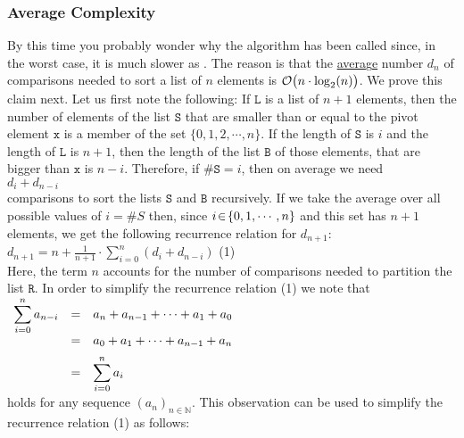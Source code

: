 \subsubsection{Average Complexity}
By this time you probably wonder why the algorithm has been called  since, in the worst case,
it is much slower as .  The reason is that the \underline{avera}g\underline{e} number $d_n$ of 
comparisons needed to sort a list of $n$ elements is $\mathcal{O}\bigl(n \cdot \log_2(n)\bigr)$. We prove
this claim next.  Let us first note the following: If $\mathtt{L}$ is a list of $n+1$ elements, then the number of elements of the 
list $\mathtt{S}$ that are smaller than or equal to the pivot element $\mathtt{x}$ is a member of the set 
$\{0,1,2,\cdots,n\}$.  If the length of $\mathtt{S}$ is $i$ and the length of $\mathtt{L}$ is $n+1$, then the length
of the list $\mathtt{B}$ of those elements, that are bigger than $\mathtt{x}$ is $n-i$.  Therefore, if $\#\mathtt{S} = i$, then on average we need
\\[0.2cm]
\hspace*{1.3cm} $d_i + d_{n-i}$ \\[0.2cm]
comparisons to sort the lists $\mathtt{S}$ and $\mathtt{B}$ recursively.  If we take the average over all possible values of
 $i = \#S$ then, since $i \!\in\!\{0,1,\cdots,n\}$ and this set has $n+1$ elements, we get the following
 recurrence relation for $d_{n+1}$: 
\\[0.2cm]
\hspace*{1.3cm}
$\displaystyle d_{n+1} = n + \frac{1}{n+1} \cdot \sum\limits_{i=0}^n (d_i + d_{n-i}) $ \hspace*{\fill} (1) 
\\[0.2cm] 
Here, the term $n$ accounts for the number of comparisons needed to partition the list $\mathtt{R}$.
In order to simplify the recurrence relation (1) we note that
\\[0.2cm]
\hspace*{1.3cm}
$
\begin{array}[t]{lcl}
 \displaystyle
 \sum\limits_{i=0}^n a_{n-i} & = & a_n + a_{n-1} + \cdots + a_1 + a_0 \\[0.2cm]
                    & = & a_0 + a_1 + \cdots + a_{n-1} + a_n \\[0.2cm]
                    & = & \displaystyle \sum\limits_{i=0}^n a_i 
\end{array}
$
\\[0.2cm]
holds for any sequence $(a_n)_{n\in\mathbb{N}}$.
This observation can be used to simplify the recurrence relation (1) as follows:

